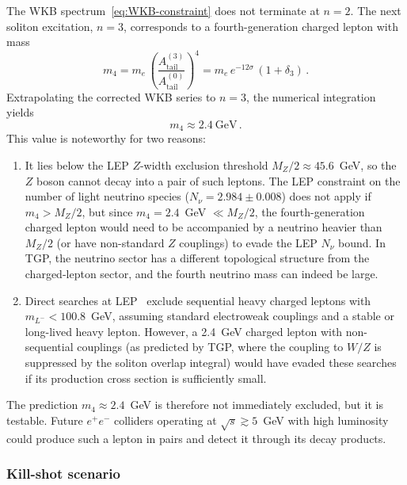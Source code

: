\documentclass[11pt,a4paper]{article}
\newcommand{\Atail}{A_{\mathrm{tail}}}
\newcommand{\MZ}{M_Z}
\newcommand{\me}{m_e}
\begin{document}
The WKB spectrum~\eqref{eq:WKB-constraint} does not terminate
at $n=2$.  The next soliton excitation, $n=3$, corresponds to a
fourth-generation charged lepton with mass
\begin{equation}\label{eq:m4}
  m_4 = \me\,\left(\frac{\Atail^{(3)}}{\Atail^{(0)}}\right)^{\!4}
  = \me\,e^{-12\sigma}\,(1+\delta_3)\,.
\end{equation}
Extrapolating the corrected WKB series to $n=3$, the numerical
integration yields
\begin{equation}\label{eq:m4-value}
  m_4 \approx 2.4~\text{GeV}\,.
\end{equation}
This value is noteworthy for two reasons:
\begin{enumerate}
  \item It lies below the LEP $Z$-width exclusion threshold
        $\MZ/2 \approx 45.6$~GeV, so the $Z$ boson cannot
        decay into a pair of such leptons.  The LEP constraint
        on the number of light neutrino species ($N_\nu = 2.984
        \pm 0.008$) does not apply if $m_4 > \MZ/2$, but since
        $m_4 = 2.4$~GeV $\ll \MZ/2$, the fourth-generation
        charged lepton would need to be accompanied by a
        neutrino heavier than $\MZ/2$ (or have non-standard
        $Z$ couplings) to evade the LEP $N_\nu$ bound.
        In TGP, the neutrino sector has a different topological
        structure from the charged-lepton sector, and the
        fourth neutrino mass can indeed be large.

  \item Direct searches at LEP~\cite{LEP2006} exclude
        sequential heavy charged leptons with
        $m_{L^-} < 100.8$~GeV, assuming standard electroweak
        couplings and a stable or long-lived heavy lepton.
        However, a 2.4~GeV charged lepton with non-sequential
        couplings (as predicted by TGP, where the coupling
        to $W/Z$ is suppressed by the soliton overlap integral)
        would have evaded these searches if its production
        cross section is sufficiently small.
\end{enumerate}

The prediction $m_4 \approx 2.4$~GeV is therefore not immediately
excluded, but it is testable.  Future $e^+e^-$ colliders operating
at $\sqrt{s} \gtrsim 5$~GeV with high luminosity could produce
such a lepton in pairs and detect it through its decay products.

\subsubsection{Kill-shot scenario}
\end{document}
